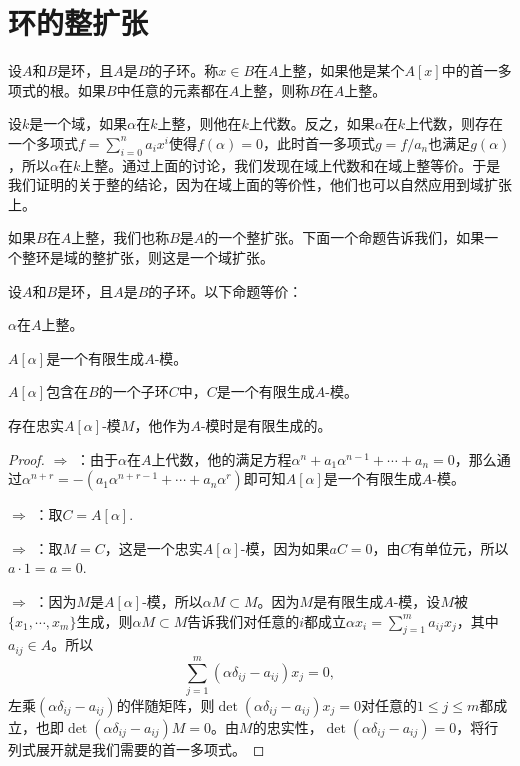\section{环的整扩张}

\para 设$A$和$B$是环，且$A$是$B$的子环。称$x\in B$在$A$上整，如果他是某个$A[x]$中的首一多项式的根。如果$B$中任意的元素都在$A$上整，则称$B$在$A$上整。

设$k$是一个域，如果$\alpha$在$k$上整，则他在$k$上代数。反之，如果$\alpha$在$k$上代数，则存在一个多项式$f=\sum_{i=0}^na_ix^i$使得$f(\alpha)=0$，此时首一多项式$g=f/a_n$也满足$g(\alpha)$，所以$\alpha$在$k$上整。通过上面的讨论，我们发现在域上代数和在域上整等价。于是我们证明的关于整的结论，因为在域上面的等价性，他们也可以自然应用到域扩张上。

如果$B$在$A$上整，我们也称$B$是$A$的一个整扩张。下面一个命题告诉我们，如果一个整环是域的整扩张，则这是一个域扩张。

\begin{pro}\label{p2:1}
	设$A$和$B$是环，且$A$是$B$的子环。以下命题等价：
	\begin{compactenum}[~~~(1)]
		\item $\alpha$在$A$上整。
		\item $A[\alpha]$是一个有限生成$A$-模。
		\item $A[\alpha]$包含在$B$的一个子环$C$中，$C$是一个有限生成$A$-模。
		\item 存在忠实$A[\alpha]$-模$M$，他作为$A$-模时是有限生成的。
	\end{compactenum}
\end{pro}	

\begin{proof} 
	 $\Rightarrow$  ：由于$\alpha$在$A$上代数，他的满足方程$\alpha^n+a_1\alpha^{n-1}+\cdots+a_n=0$，那么通过$\alpha^{n+r}=-(a_1\alpha^{n+r-1}+\cdots+a_n\alpha^r)$即可知$A[\alpha]$是一个有限生成$A$-模。

	 $\Rightarrow$  ：取$C=A[\alpha]$.

	 $\Rightarrow$  ：取$M=C$，这是一个忠实$A[\alpha]$-模，因为如果$aC=0$，由$C$有单位元，所以$a\cdot 1=a=0$.

	 $\Rightarrow$  ：因为$M$是$A[\alpha]$-模，所以$\alpha M\subset M$。因为$M$是有限生成$A$-模，设$M$被$\{x_1,\cdots,x_m\}$生成，则$\alpha M\subset M$告诉我们对任意的$i$都成立$\alpha x_i=\sum_{j=1}^m a_{ij} x_j$，其中$a_{ij}\in A$。所以
	\[
		\sum_{j=1}^m (\alpha\delta_{ij} -a_{ij})x_j=0,
	\]
	左乘$(\alpha\delta_{ij} -a_{ij})$的伴随矩阵，则$\det(\alpha\delta_{ij} -a_{ij})x_j=0$对任意的$1\leq j \leq m$都成立，也即$\det(\alpha\delta_{ij} -a_{ij})M=0$。由$M$的忠实性，$\det(\alpha\delta_{ij} -a_{ij})=0$，将行列式展开就是我们需要的首一多项式。
\end{proof}

